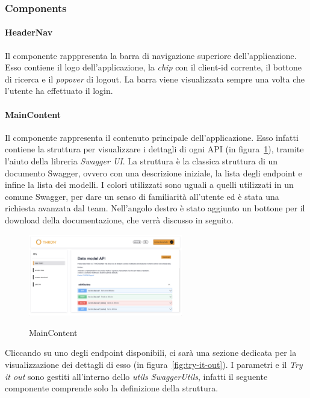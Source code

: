 \subsubsection{Components}\label{subsubsec:components}

\paragraph{HeaderNav}\label{par:header-nav}
Il componente rapppresenta la barra di navigazione superiore dell'applicazione. Esso contiene il logo dell'applicazione, la \textit{chip} con il client-id
corrente, il bottone di ricerca e il \textit{popover} di logout. 
La barra viene visualizzata sempre una volta che l'utente ha effettuato il login.\\

\paragraph{MainContent}\label{par:main-content}
Il componente rappresenta il contenuto principale dell'applicazione. Esso infatti contiene la struttura per visualizzare i dettagli di ogni API (in figura~\ref{fig:main-content}), tramite l'aiuto 
della libreria \textit{Swagger UI}.
La struttura è la classica struttura di un documento Swagger, ovvero con una descrizione iniziale, la lista degli endpoint e infine la lista dei modelli.
I colori utilizzati sono uguali a quelli utilizzati in un comune Swagger, per dare un senso di familiarità all'utente ed è stata una richiesta avanzata dal team.
Nell'angolo destro è stato aggiunto un bottone per il download della documentazione, che verrà discusso in seguito.
\begin{figure}[ht]
  \centering
  \includegraphics[width=0.6\textwidth, alt={Sezione per la visualizzazione dei dettagli di un API}]{images/frontend/DataModelView.jpg}
  \caption{MainContent}\label{fig:main-content}
\end{figure}
Cliccando su uno degli endpoint disponibili, ci sarà una sezione dedicata per la visualizzazione dei dettagli di esso (in figura~\ref{fig:try-it-out}).
I parametri e il \textit{Try it out} sono gestiti all'interno dello \textit{utils SwaggerUtils}, infatti il seguente componente comprende solo la definizione
della struttura.

